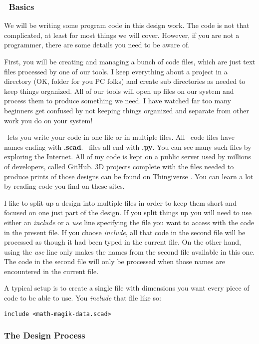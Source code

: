 \subsubsection{\osc\ Basics}

We will be writing some program code in this design work. The code is not that
complicated, at least for most things we will cover. However, if you are not a
programmer, there are some details you need to be aware of.

First, you will be creating and managing a bunch of code files, which are just
text files processed by one of our tools. I keep everything about a project in
a directory (OK, folder for you PC folks) and create sub directories as needed
to keep things organized. All of our tools will open up files on our system and
process them to produce something we need. I have watched far too many
beginners get confused by not keeping things organized and separate from other
work you do on your system!

\osc\ lets you write your code in one file or in multiple files. All \osc\ code
files have names ending with {\bf .scad}. \PY\ files all end with {\bf .py}.
You can see many such files by exploring the Internet. All of my code is kept
on a public server used by millions of developers, called GitHub. 3D projects
complete with the files needed to produce prints of those designs can be found on
Thingiverse \cite{thingy}. You can learn a lot by reading code you find on these sites.

I like to split up a design into multiple files in order to keep them short and
focused on one just part of the design. If you split things up you will need to
use either an {\it include} or a {\it use} line specifying the file you want to
access with the code in the present file. If you choose {\it include}, all that
code in the second file will be processed as though it had been typed in the
current file.  On the other hand, using the {\it use} line only makes the names
from the second file available in this one. The code in the second file will
only be processed when those names are encountered in the current file.

A typical setup is to create a single file with dimensions you want every piece
of code to be able to use. You {\it include} that file like so:

\begin{lstlisting}
include <math-magik-data.scad>
\end{lstlisting}

\subsubsection{The Design Process}

